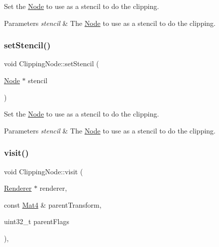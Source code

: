 Set the \hyperlink{classNode}{Node} to use as a stencil to do the clipping.


\begin{DoxyParams}{Parameters}
{\em stencil} & The \hyperlink{classNode}{Node} to use as a stencil to do the clipping. \\
\hline
\end{DoxyParams}
\mbox{\label{classClippingNode_ac8c8dfe6eb2eeb894546eef8b6404d71}} 
\subsubsection{\texorpdfstring{set\+Stencil()}{setStencil()}\hspace{0.1cm}{\footnotesize\ttfamily [2/2]}}
{\footnotesize\ttfamily void Clipping\+Node\+::set\+Stencil (\begin{DoxyParamCaption}\item[{\hyperlink{classNode}{Node} $\ast$}]{stencil }\end{DoxyParamCaption})}

Set the \hyperlink{classNode}{Node} to use as a stencil to do the clipping.


\begin{DoxyParams}{Parameters}
{\em stencil} & The \hyperlink{classNode}{Node} to use as a stencil to do the clipping. \\
\hline
\end{DoxyParams}
\mbox{\label{classClippingNode_abe6402dbaf99cbf1e4b16add726b2a56}} 
\subsubsection{\texorpdfstring{visit()}{visit()}\hspace{0.1cm}{\footnotesize\ttfamily [1/2]}}
{\footnotesize\ttfamily void Clipping\+Node\+::visit (\begin{DoxyParamCaption}\item[{\hyperlink{classRenderer}{Renderer} $\ast$}]{renderer,  }\item[{const \hyperlink{classMat4}{Mat4} \&}]{parent\+Transform,  }\item[{uint32\+\_\+t}]{parent\+Flags }\end{DoxyParamCaption})\hspace{0.3cm}{\ttfamily [override]}, {\ttfamily [virtual]}}

